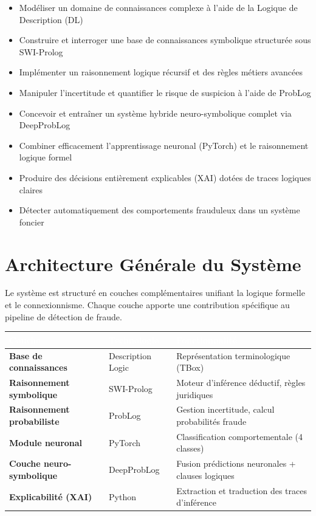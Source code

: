 \documentclass[11pt,a4paper]{report}
\begin{document}
\begin{itemize}[leftmargin=*]
  \item Modéliser un domaine de connaissances complexe à l'aide de la Logique de Description (DL)
  \item Construire et interroger une base de connaissances symbolique structurée sous SWI-Prolog
  \item Implémenter un raisonnement logique récursif et des règles métiers avancées
  \item Manipuler l'incertitude et quantifier le risque de suspicion à l'aide de ProbLog
  \item Concevoir et entraîner un système hybride neuro-symbolique complet via DeepProbLog
  \item Combiner efficacement l'apprentissage neuronal (PyTorch) et le raisonnement logique formel
  \item Produire des décisions entièrement explicables (XAI) dotées de traces logiques claires
  \item Détecter automatiquement des comportements frauduleux dans un système foncier
\end{itemize}

\chapter*{Architecture Générale du Système}

Le système est structuré en couches complémentaires unifiant la logique formelle et le
connexionnisme. Chaque couche apporte une contribution spécifique au pipeline de
détection de fraude.

\begin{center}
\begin{tabular}{>{\bfseries}p{3.8cm} p{3.2cm} p{6.5cm}}
\toprule
\rowcolor{tablehead}\textcolor{white}{Couche} & \textcolor{white}{Technologie} & \textcolor{white}{Fonctionnalité} \\
\midrule
Base de connaissances    & Description Logic & Représentation terminologique (TBox) \\
Raisonnement symbolique  & SWI-Prolog        & Moteur d'inférence déductif, règles juridiques \\
Raisonnement probabiliste& ProbLog           & Gestion incertitude, calcul probabilités fraude \\
Module neuronal          & PyTorch           & Classification comportementale (4 classes) \\
Couche neuro-symbolique  & DeepProbLog       & Fusion prédictions neuronales + clauses logiques \\
Explicabilité (XAI)      & Python            & Extraction et traduction des traces d'inférence \\
\bottomrule
\end{tabular}
\end{center}
\end{document}
